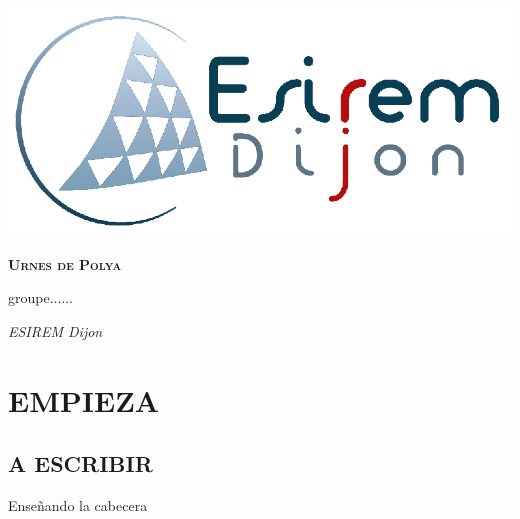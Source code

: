 \documentclass[11pt]{report}
\newcommand\blankpage{%
    \null
    \thispagestyle{empty}%
    \addtocounter{page}{-1}%
    \newpage}
\newcommand{\titulo}{\color{blue}Urnes de Polya}
\newcommand{\autor}{groupe......}
\newcommand{\fecha}{ESIREM Dijon}
\begin{document}
    \cfoot{\thepage}
    
    \begin{titlepage}
        \reversemarginpar{}
        
        {\centering
            \vspace{3cm} %
            \hspace{5cm} \includegraphics[width=.4\textwidth]{figs/Logo_Esirem.png} %
            \par\vspace{5cm}
            {\scshape\huge\textbf{\hspace{2cm}\titulo}} \par\vspace{6cm}
            
            {\LARGE
            \begin{flushright}
                    \item \autor 
                    \item \textit{\fecha}
            \end{flushright}
            }
        }
    \end{titlepage}

    \afterpage{\blankpage}
    
\begingroup
    \tableofcontents
\endgroup    
    \newpage
    \chapter{EMPIEZA}
        \section{A ESCRIBIR}
            \newpage Enseñando la cabecera
            
\end{document}
